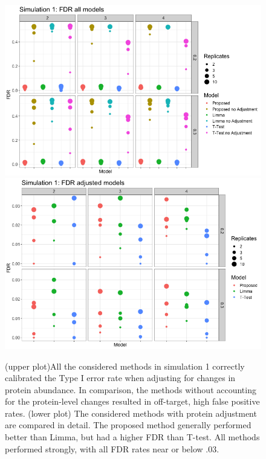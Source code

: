 \documentclass{mcp}
\begin{document}
\begin{figure}[h!]
\centering
\includegraphics[width=.85\textwidth]{sim_new/sim1_FDR_all_models}\\
\includegraphics[width=.85\textwidth]{sim_new/sim1_FDR}
\caption{(upper plot)All the considered methods in simulation 1 correctly calibrated the Type I error rate when adjusting for changes in protein abundance. In comparison, the methods without accounting for the protein-level changes resulted in off-target, high false positive rates. (lower plot) The considered methods with protein adjustment are compared in detail. The proposed method generally performed better than Limma, but had a higher FDR than T-test. All methods performed strongly, with all FDR rates near or below .03. \label{fig:sim1_fpr}}
\end{figure}
\end{document}
